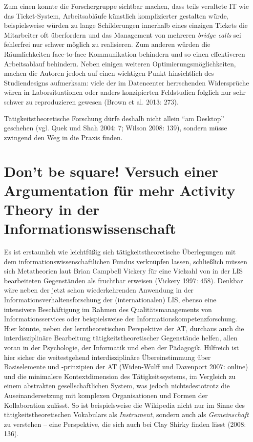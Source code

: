 \documentclass[a4paper,
fontsize=11pt,
oneside,
numbers=noperiodatend,
parskip=half-,
bibliography=totoc,
final
]{scrartcl}
\begin{document}
Zum einen konnte die Forschergruppe sichtbar machen, dass teils
veraltete IT wie das Ticket-System, Arbeitsabläufe künstlich
komplizierter gestalten würde, beispielsweise würden zu lange
Schilderungen innerhalb eines einzigen Tickets die Mitarbeiter oft
überfordern und das Management von mehreren \emph{bridge calls} sei
fehlerfrei nur schwer möglich zu realisieren. Zum anderen würden die
Räumlichkeiten face-to-face Kommunikation behindern und so einen
effektiveren Arbeitsablauf behindern. Neben einigen weiteren
Optimierungsmöglichkeiten, machen die Autoren jedoch auf einen wichtigen
Punkt hinsichtlich des Studiendesigns aufmerksam: viele der im
Datencenter herrschenden Widersprüche wären in Laborsituationen oder
anders konzipierten Feldstudien folglich nur sehr schwer zu
reproduzieren gewesen (Brown et al. 2013: 273).

Tätigkeitstheoretische Forschung dürfe deshalb nicht allein \enquote{am
Desktop} geschehen (vgl. Quek und Shah 2004: 7; Wilson 2008: 139),
sondern müsse zwingend den Weg in die Praxis finden.

\section*{Don't be square! Versuch einer Argumentation für mehr
Activity Theory in der
Informationswissenschaft}\label{dont-be-square-versuch-einer-argumentation-fuxfcr-mehr-activity-theory-in-der-informationswissenschaft}

Es ist erstaunlich wie leichtfüßig sich tätigkeitstheoretische
Überlegungen mit dem informationswissenschaftlichen Fundus verknüpfen
lassen, schließlich müssen sich Metatheorien laut Brian Campbell Vickery
für eine Vielzahl von in der LIS bearbeiteten Gegenständen als fruchtbar
erweisen (Vickery 1997: 458). Denkbar wäre neben der jetzt schon
wiederkehrenden Anwendung in der Informationsverhaltensforschung der
(internationalen) LIS, ebenso eine intensivere Beschäftigung im Rahmen
des Qualitätsmanagements von Informationsservices oder beispielsweise
der Informationskompetenzforschung. Hier könnte, neben der
lerntheoretischen Perspektive der AT, durchaus auch die
interdisziplinäre Bearbeitung tätigkeitstheoretischer Gegenstände
helfen, allen voran in der Psychologie, der Informatik und eben der
Pädagogik. Hilfreich ist hier sicher die weitestgehend interdisziplinäre
Übereinstimmung über Basiselemente und -prinzipien der AT (Widen-Wulff
und Davenport 2007: online) und die minimalere Kontextdimension des
Tätigkeitssystems, im Vergleich zu einem abstrakten gesellschaftlichen
System, was jedoch nichtsdestotrotz die Auseinandersetzung mit komplexen
Organisationen und Formen der Kollaboration zulässt. So ist
beispielsweise die Wikipedia nicht nur im Sinne des
tätigkeitstheoretischen Vokabulars als \emph{Instrument}, sondern auch
als \emph{Gemeinschaft} zu verstehen -- eine Perspektive, die sich auch
bei Clay Shirky finden lässt (2008: 136).
\end{document}
